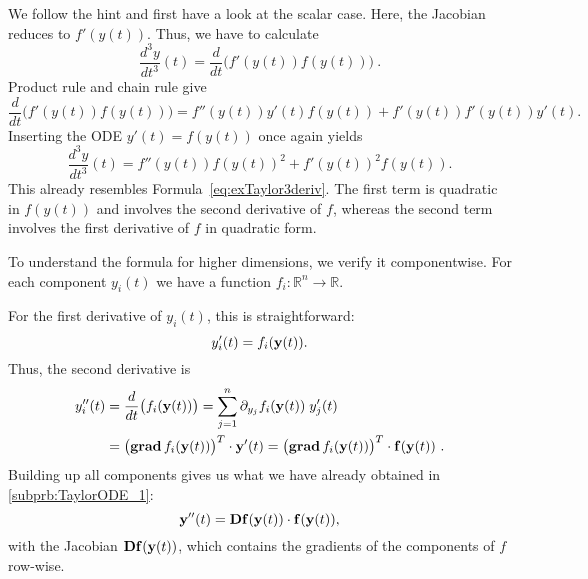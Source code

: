 \begin{problem}
\begin{subproblem}[5]
\begin{solution}
We follow the hint and first have a look at the scalar case.
Here, the Jacobian reduces to $f'(y(t))$. Thus, we have to calculate 
$$\frac{d^3y}{dt^3}(t) = \frac{d}{dt}\bigl(f'(y(t))f(y(t))\bigr)\ .$$
Product rule and chain rule give
$$\frac{d}{dt}\bigl(f'(y(t))f(y(t))\bigr) = f''(y(t))y'(t)f(y(t)) + f'(y(t))f'(y(t))y'(t).$$
Inserting the ODE $y'(t)=f(y(t))$ once again yields
$$ \frac{d^3y}{dt^3}(t) = f''(y(t))f(y(t))^2 + f'(y(t))^2f(y(t)). $$
This already resembles Formula~\ref{eq:exTaylor3deriv}.
The first term is quadratic in $f(y(t))$ and involves the second derivative of $f$, whereas the second term involves the first derivative of $f$ in quadratic form.

\vspace{4mm}
To understand the formula for higher dimensions, we verify it componentwise.
For each component $y_i(t)$ we have a function $f_i: \mathbb{R}^n \to \mathbb{R}$.

For the first derivative of $y_i(t)$, this is straightforward:
$$ y_i'(t) = f_i({\mathbf{y}}(t)).$$
Thus, the second derivative is 
\begin{align*}
y_i''(t)  &= \frac{d}{dt} \big(f_i({\mathbf{y}}(t))\big) =  \sum_{j=1}^n \partial_{y_j}f_i({\mathbf{y}}(t)) \; y'_j(t)\\
& =  \bigl(\operatorname{{\bf grad}} f_i({\mathbf{y}}(t))\bigr)^T \cdot {\mathbf{y}}'(t)  = \bigl(\operatorname{{\bf grad}} f_i({\mathbf{y}}(t))\bigr)^T \cdot {\mathbf{f}}({\mathbf{y}}(t))\ .
\end{align*}
Building up all components gives us what we have already obtained in \ref{subprb:TaylorODE_1}:
$$    {\mathbf{y}}''(t) = {\mathbf{D}}{\mathbf{f}}({\mathbf{y}}(t))\cdot {\mathbf{f}}({\mathbf{y}}(t)),$$
with the Jacobian ${\mathbf{D}}{\mathbf{f}}({\mathbf{y}}(t))$, which contains the gradients of the components of $f$ row-wise.


\end{solution}
\end{subproblem}
\end{problem}
